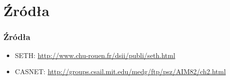 \section{Źródła}

\begin{frame}
    \frametitle{Źródła}
    \begin{itemize}
        \item SETH: \url{http://www.chu-rouen.fr/dsii/publi/seth.html}
        \item CASNET: \url{http://groups.csail.mit.edu/medg/ftp/psz/AIM82/ch2.html}
    \end{itemize}
\end{frame}

